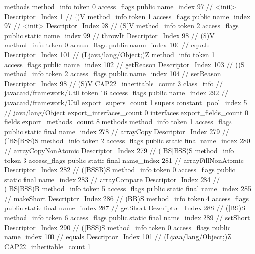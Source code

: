 {{{			methods {
				method_info {
					token	0
					access_flags	public
					name_index	97		// <init>
					Descriptor_Index	1		// ()V
				}
				method_info {
					token	1
					access_flags	public
					name_index	97		// <init>
					Descriptor_Index	98		// (S)V
				}
				method_info {
					token	2
					access_flags	public static
					name_index	99		// throwIt
					Descriptor_Index	98		// (S)V
				}
				method_info {
					token	0
					access_flags	public
					name_index	100		// equals
					Descriptor_Index	101		// (Ljava/lang/Object;)Z
				}
				method_info {
					token	1
					access_flags	public
					name_index	102		// getReason
					Descriptor_Index	103		// ()S
				}
				method_info {
					token	2
					access_flags	public
					name_index	104		// setReason
					Descriptor_Index	98		// (S)V
				}
			}
			CAP22_inheritable_count	3
		}
		class_info {		// javacard/framework/Util
			token	16
			access_flags	public
			name_index	292		// javacard/framework/Util
			export_supers_count	1
			supers {
				constant_pool_index	5		// java/lang/Object
			}
			export_interfaces_count	0
			interfaces {
			}
			export_fields_count	0
			fields {
			}
			export_methods_count	8
			methods {
				method_info {
					token	1
					access_flags	public static final
					name_index	278		// arrayCopy
					Descriptor_Index	279		// ([BS[BSS)S
				}
				method_info {
					token	2
					access_flags	public static final
					name_index	280		// arrayCopyNonAtomic
					Descriptor_Index	279		// ([BS[BSS)S
				}
				method_info {
					token	3
					access_flags	public static final
					name_index	281		// arrayFillNonAtomic
					Descriptor_Index	282		// ([BSSB)S
				}
				method_info {
					token	0
					access_flags	public static final
					name_index	283		// arrayCompare
					Descriptor_Index	284		// ([BS[BSS)B
				}
				method_info {
					token	5
					access_flags	public static final
					name_index	285		// makeShort
					Descriptor_Index	286		// (BB)S
				}
				method_info {
					token	4
					access_flags	public static final
					name_index	287		// getShort
					Descriptor_Index	288		// ([BS)S
				}
				method_info {
					token	6
					access_flags	public static final
					name_index	289		// setShort
					Descriptor_Index	290		// ([BSS)S
				}
				method_info {
					token	0
					access_flags	public
					name_index	100		// equals
					Descriptor_Index	101		// (Ljava/lang/Object;)Z
				}
			}
			CAP22_inheritable_count	1
		}
	}
}
